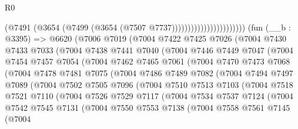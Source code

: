 \begin{lexlean}{R0}
\begin{coremodule}
                                        (@7491
                                          (@3654 (@7499 (@3654 (@7507 @7737)))))))))))))))))))))))
    (fun (__b : @3395) =>
    @6620
      (@7006
        @7019
        (@7004
          @7422
          @7425
          @7026
          (@7004
            @7430
            @7433
            @7033
            (@7004
              @7438
              @7441
              @7040
              (@7004
                @7446
                @7449
                @7047
                (@7004
                  @7454
                  @7457
                  @7054
                  (@7004
                    @7462
                    @7465
                    @7061
                    (@7004
                      @7470
                      @7473
                      @7068
                      (@7004
                        @7478
                        @7481
                        @7075
                        (@7004
                          @7486
                          @7489
                          @7082
                          (@7004
                            @7494
                            @7497
                            @7089
                            (@7004
                              @7502
                              @7505
                              @7096
                              (@7004
                                @7510
                                @7513
                                @7103
                                (@7004
                                  @7518
                                  @7521
                                  @7110
                                  (@7004
                                    @7526
                                    @7529
                                    @7117
                                    (@7004
                                      @7534
                                      @7537
                                      @7124
                                      (@7004
                                        @7542
                                        @7545
                                        @7131
                                        (@7004
                                          @7550
                                          @7553
                                          @7138
                                          (@7004
                                            @7558
                                            @7561
                                            @7145
                                            (@7004

\end{coremodule}
\end{lexlean}

